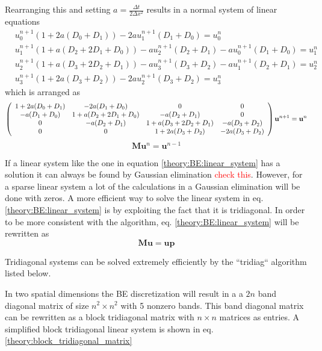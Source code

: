 Rearranging this and setting $a = \frac{\Delta t}{2\Delta x^2}$ results in a normal system of linear equations
\begin{align*}
 &u^{n+1}_0\left(1+2a(D_0+D_1)\right)- 2au^{n+1}_{1}(D_1+D_0) =  u^n_0\\
 &u^{n+1}_1\left(1+a(D_2+2D_1+D_0)\right)-au^{n+1}_{2}(D_2+D_1)-au^{n+1}_{0}(D_1+D_0) = u^n_1\\
 &u^{n+1}_2\left(1+a(D_3+2D_2+D_1)\right)-au^{n+1}_{3}(D_3+D_2)-au^{n+1}_{1}(D_2+D_1) = u^n_2\\
 &u^{n+1}_3\left(1+2a(D_3+D_2)\right)- 2au^{n+1}_{2}(D_3+D_2) =  u^n_3
\end{align*}
which is arranged as 
{\scriptsize
\begin{align}\label{BE}
 \left(\begin{array}{c c c c}
        1+2a(D_0+D_1) & -2a(D_1+D_0) &0 &0 \\
        -a(D_1+D_0) &1+a(D_2+2D_1+D_0) & -a(D_2+D_1) &0 \\
        0& -a(D_2+D_1) & 1+a(D_3+2D_2+D_1)& -a(D_3+D_2)\\
        0& 0& 1+2a(D_3+D_2) & - 2a(D_3+D_2)\\
       \end{array}\right)\mathbf{u}^{n+1} = \mathbf{u}^{n}
\end{align}
}
\begin{equation}\label{theory:BE:linear_system}
  \mathbf{M}\mathbf{u}^n = \mathbf{u}^{n-1}
\end{equation}

If a linear system like the one in equation \eqref{theory:BE:linear_system} has a solution it can always be found by Gaussian elimination \textcolor{red}{check this}. 
However, for a sparse linear system a lot of the calculations in a Gaussian elimination will be done with zeros. 
A more efficient way to solve the linear system in eq. \eqref{theory:BE:linear_system} is by exploiting the fact that it is tridiagonal. 
In order to be more consistent with the algorithm, eq. \eqref{theory:BE:linear_system} will be rewritten as
\begin{equation}
  \mathbf{M}\mathbf{u} = \mathbf{up}
\end{equation}

Tridiagonal systems can be solved extremely efficiently by the ``tridiag`` algorithm listed below.



In two spatial dimensions the BE discretization will result in a a $2n$ band diagonal matrix of size $n^2\times n^2$ with 5 nonzero bands. 
This band diagonal matrix can be rewritten as a block tridiagonal matrix with $n\times n$ matrices as entries. 
A simplified block tridiagonal linear system is shown in eq. \eqref{theory:block_tridiagonal_matrix}


